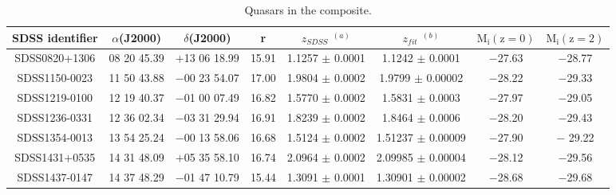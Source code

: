 \begin{table*}
\centering
\begin{center}
\caption{Quasars in the composite. \label{tab:targets}}
\begin{tabular}{cccccccc}
\hline
\noalign{\smallskip}
SDSS identifier & $\alpha$(J2000) & $\delta$(J2000) & r &  $z_{SDSS}$ $^{(a)}$  &  $z_{fit}$ $^{(b)}$ & $\mathrm{M_i (z=0)}$ & $\mathrm{M_i (z=2)}$\\  
\hline

SDSS0820+1306  & 08 20 45.39 & $+$13 06 18.99 & 15.91 & 1.1257 $\pm$ 0.0001 & 1.1242 $\pm$ 0.0001  &   $-$27.63 &   $-$28.77       \\
SDSS1150-0023  & 11 50 43.88 & $-$00 23 54.07 & 17.00 & 1.9804 $\pm$ 0.0002 & 1.9799 $\pm$ 0.00002   &   $-$28.22 &   $-$29.33         \\
SDSS1219-0100  & 12 19 40.37& $-$01 00 07.49& 16.82 & 1.5770 $\pm$ 0.0002  & 1.5831 $\pm$ 0.0003  &   $-$27.97 &  $-$29.05           \\
SDSS1236-0331  & 12 36 02.34 & $-$03 31 29.94 & 16.91 & 1.8239 $\pm$ 0.0002   & 1.8464 $\pm$ 0.0006   &   $-$28.20 &   $-$29.43        \\
SDSS1354-0013  & 13 54 25.24 & $-$00 13 58.06 & 16.68 & 1.5124 $\pm$ 0.0002 & 1.51237 $\pm$  0.00009    &   $-$27.90 &  $-$ 29.22       \\
SDSS1431+0535  & 14 31 48.09 & $+$05 35 58.10 & 16.74 & 2.0964 $\pm$ 0.0002 & 2.09985 $\pm$  0.00004   &   $-$28.12 &  $-$29.56     \\
SDSS1437-0147  & 14 37 48.29 & $-$01 47 10.79 & 15.44 & 1.3091 $\pm$ 0.0001& 1.30901 $\pm$  0.00002   &   $-$28.68 &   $-$29.68     \\

\hline
\hline
\end{tabular}
\end{center}


\end{table*}



